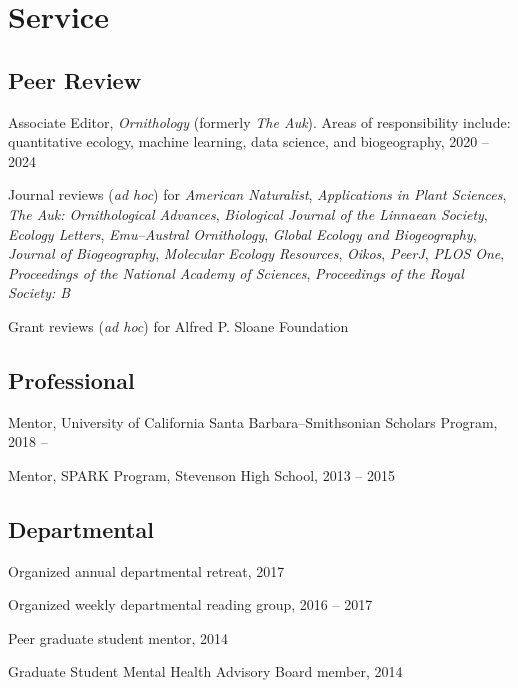 \documentclass[letterpaper]{article}
\newenvironment{biblist}{%
   \begin{list}{}{%
     \setlength{\labelwidth}{0pt}%
     \setlength{\labelsep}{1em}%
     \setlength{\leftmargin}{2em}%
     \setlength{\itemindent}{-1em}%
   }
}{\end{list}}
\begin{document}
\section*{Service}
\subsection*{Peer Review}
\begin{biblist}
\item Associate Editor, \emph{Ornithology} (formerly \emph{The Auk}). Areas of responsibility include: quantitative ecology, machine learning, data science, and biogeography, 2020 -- 2024
\item Journal reviews (\emph{ad hoc}) for \emph{American Naturalist},  \emph{Applications in Plant Sciences}, \emph{The Auk: Ornithological Advances}, \emph{Biological Journal of the Linnaean Society}, \emph{Ecology Letters}, \emph{Emu--Austral Ornithology}, \emph{Global Ecology and Biogeography}, \emph{Journal of Biogeography}, \emph{Molecular Ecology Resources}, \emph{Oikos}, \emph{PeerJ}, \emph{PLOS One}, \emph{Proceedings of the National Academy of Sciences}, \emph{Proceedings of the Royal Society: B}
\item Grant reviews (\emph{ad hoc}) for Alfred P. Sloane Foundation
\end{biblist}
\subsection*{Professional}
\begin{biblist}
\item Mentor, University of California Santa Barbara--Smithsonian Scholars Program, 2018 --
\item Mentor, SPARK Program, Stevenson High School, 2013 -- 2015
\end{biblist}
\subsection*{Departmental}
\begin{biblist}
\item Organized annual departmental retreat, 2017
\item Organized weekly departmental reading group, 2016 -- 2017
\item Peer graduate student mentor, 2014
\item Graduate Student Mental Health Advisory Board member, 2014
\end{biblist}
\end{document}
